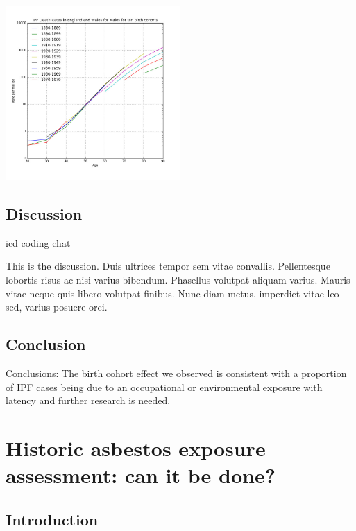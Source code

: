 \documentclass[12pt,a4paper,]{report}
\let\origfigure=\figure
\let\endorigfigure=\endfigure
\renewenvironment{figure}[1][]{%
\origfigure[b]
}{%
\endorigfigure
}
\begin{document}
\begin{figure}
\centering
\includegraphics[width=0.5\textwidth,height=\textheight]{./tex2pdf.-c788ce828caea25c/9a5e429b5393b4c4d41e95eeebdd7dc75dc9dab5.jpg}
\caption{IPF male birth cohorts \label{birthcohorts}}
\end{figure}

\hypertarget{discussion-1}{%
\section{Discussion}\label{discussion-1}}

icd coding chat

This is the discussion. Duis ultrices tempor sem vitae convallis.
Pellentesque lobortis risus ac nisi varius bibendum. Phasellus volutpat
aliquam varius. Mauris vitae neque quis libero volutpat finibus. Nunc
diam metus, imperdiet vitae leo sed, varius posuere orci.

\hypertarget{conclusion-1}{%
\section{Conclusion}\label{conclusion-1}}

Conclusions: The birth cohort effect we observed is consistent with a
proportion of IPF cases being due to an occupational or environmental
exposure with latency and further research is needed.

\hypertarget{historic-asbestos-exposure-assessment-can-it-be-done}{%
\chapter{Historic asbestos exposure assessment: can it be
done?}\label{historic-asbestos-exposure-assessment-can-it-be-done}}

\hypertarget{introduction-2}{%
\section{Introduction}\label{introduction-2}}
\end{document}
